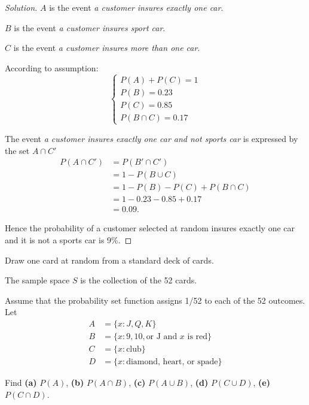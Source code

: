 \documentclass[class=probandstats,crop=false]{standalone}
\begin{document}
\begin{proof}[Solution]
    \par $A$ is the event \textit{a customer insures exactly one car}.
    \par $B$ is the event \textit{a customer insures sport car}.
    \par $C$ is the event \textit{a customer insures more than one car}.
    \par According to assumption:
    \[
        \begin{cases}
            P(A) + P(C) = 1 \\
            P(B) = 0.23     \\
            P(C) = 0.85     \\
            P(B\cap C) = 0.17
        \end{cases}
    \]
    \par The event \textit{a customer insures exactly one car and not sports car} is expressed by the set $A\cap C'$
    \begin{align*}
        P(A\cap C') & = P(B'\cap C')                 \\
                    & = 1 - P(B\cup C)               \\
                    & = 1 - P(B) - P(C) + P(B\cap C) \\
                    & = 1 - 0.23 - 0.85 + 0.17       \\
                    & = 0.09.
    \end{align*}
    \par Hence the probability of a customer selected at random insures exactly one car and it is not a sports car is 9\%.
\end{proof}

\begin{exercise}
    \par Draw one card at random from a standard deck of cards.
    \par The sample space $S$ is the collection of the 52 cards.
    \par Assume that the probability set function assigns 1/52 to each of the 52 outcomes. Let
    \begin{align*}
        A & = \{ x: J, Q, K \}                           \\
        B & = \{ x: 9, 10, \text{or J and $x$ is red} \} \\
        C & = \{ x: \text{club} \}                       \\
        D & = \{ x: \text{diamond, heart, or spade} \}
    \end{align*}
    \par Find \textbf{(a)} $P(A)$, \textbf{(b)} $P(A\cap B)$, \textbf{(c)} $P(A\cup B)$, \textbf{(d)} $P(C\cup D)$, \textbf{(e)} $P(C\cap D)$.
\end{exercise}
\end{document}
